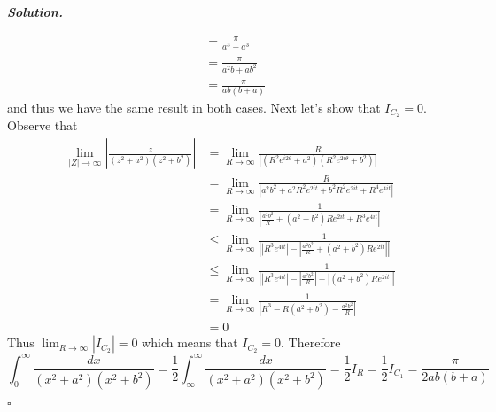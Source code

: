 \documentclass[12pt]{report}
\newenvironment{solution}[1][\it{Solution}]{\textbf{#1. } }{$\square$}
\begin{document}
\begin{solution}
\begin{enumerate}
\begin{align*}
            &= \frac{\pi}{a^3 + a^3}\\
            &= \frac{\pi}{a^2b + ab^2}\\
            &= \frac{\pi}{ab(b + a)}
        \end{align*}
        and thus we have the same result in both cases. Next let's show that $I_{C_2} = 0$. Observe that 
        \begin{align*}
            \lim_{|Z| \rightarrow \infty} \left| \frac{z}{(z^2 + a^2)(z^2 + b^2)} \right| &= \lim_{R \rightarrow \infty} \frac{R}{\left|(R^2e^{i2\theta} + a^2)(R^2e^{2i\theta} + b^2)\right|}\\
            &=\lim_{R \rightarrow \infty} \frac{R}{\left|a^2 b^2 + a^2 R^2 e^{2 i t} + b^2 R^2 e^{2 i t} + R^4 e^{4 i t}\right|}\\
            &=\lim_{R \rightarrow \infty} \frac{1}{\left|\frac{a^2 b^2}{R} + (a^2 + b^2) R e^{2 i t} + R^3 e^{4 i t}\right|}\\
            &\leq \lim_{R \rightarrow \infty} \frac{1}{\left|\left|R^3 e^{4 i t}\right| - \left|\frac{a^2 b^2}{R} + (a^2 + b^2) R e^{2 i t}\right|\right|}\\
            &\leq \lim_{R \rightarrow \infty} \frac{1}{\left|\left|R^3 e^{4 i t}\right| - \left|\frac{a^2 b^2}{R}\right| - \left|(a^2 + b^2) R e^{2 i t}\right|\right|}\\
            &= \lim_{R \rightarrow \infty} \frac{1}{\left| R^3 - R(a^2 + b^2) - \frac{a^2b^2}{R}\right|}\\
            &= 0 
        \end{align*}
        Thus $\lim_{R \rightarrow \infty} |I_{C_2}| = 0$ which means that $I_{C_2} = 0$. Therefore 
        \[ \int_0^\infty \frac{dx}{(x^2 + a^2)(x^2+b^2)} = \frac{1}{2}\int_{\infty}^\infty \frac{dx}{(x^2 + a^2)(x^2+b^2)} = \frac{1}{2}I_R = \frac{1}{2}I_{C_1} = \frac{\pi}{2ab(b+a)} \]


\end{enumerate}
\end{solution}
\end{document}
